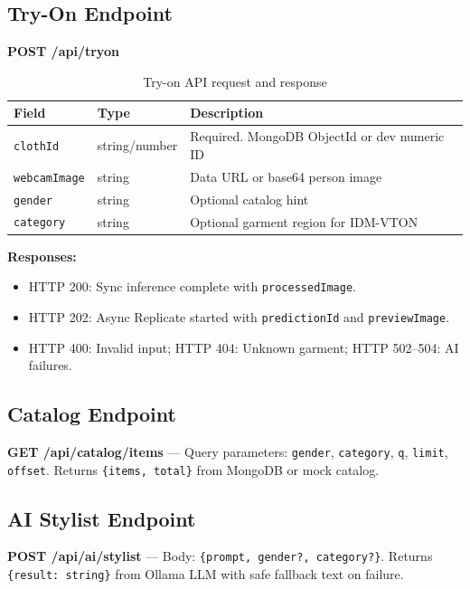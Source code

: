 \subsection{Try-On Endpoint}

\textbf{POST /api/tryon}

\begin{table}[H]
  \centering
  \caption{Try-on API request and response}
  \label{tab:tryon-api}
  \small
  \begin{tabular}{@{}llp{6cm}@{}}
    \toprule
    \textbf{Field} & \textbf{Type} & \textbf{Description} \\
    \midrule
    \texttt{clothId} & string/number & Required. MongoDB ObjectId or dev numeric ID \\
    \texttt{webcamImage} & string & Data URL or base64 person image \\
    \texttt{gender} & string & Optional catalog hint \\
    \texttt{category} & string & Optional garment region for IDM-VTON \\
    \bottomrule
  \end{tabular}
\end{table}

\textbf{Responses:}
\begin{itemize}[leftmargin=*]
  \item HTTP 200: Sync inference complete with \texttt{processedImage}.
  \item HTTP 202: Async Replicate started with \texttt{predictionId} and \texttt{previewImage}.
  \item HTTP 400: Invalid input; HTTP 404: Unknown garment; HTTP 502--504: AI failures.
\end{itemize}

\subsection{Catalog Endpoint}

\textbf{GET /api/catalog/items} --- Query parameters: \texttt{gender}, \texttt{category}, \texttt{q}, \texttt{limit}, \texttt{offset}. Returns \texttt{\{items, total\}} from MongoDB or mock catalog.

\subsection{AI Stylist Endpoint}

\textbf{POST /api/ai/stylist} --- Body: \texttt{\{prompt, gender?, category?\}}. Returns \texttt{\{result: string\}} from Ollama LLM with safe fallback text on failure.

